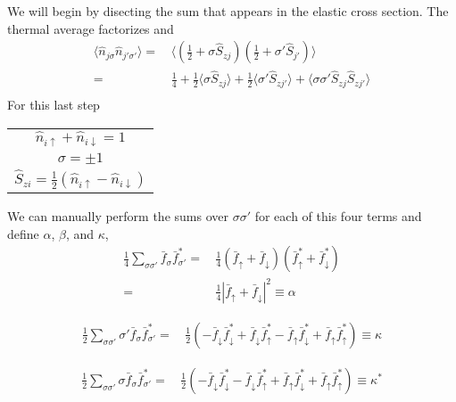 \documentclass[11pt,letter]{article}
\begin{document}
We will begin by disecting the sum that appears in the elastic cross section.   The thermal average factorizes and 
\begin{equation}
\begin{split}
\langle  \hat{n}_{j\sigma}\hat{n}_{j'\sigma'} \rangle = &\, \langle (\frac{1}{2}  + \sigma\hat{S}_{zj} )( \frac{1}{2} + \sigma'\hat{S}_{j'} ) \rangle \\
       = &\,  \frac{1}{4} + \frac{1}{2} \langle \sigma \hat{S}_{zj} \rangle +
\frac{1}{2} \langle \sigma'\hat{S}_{zj'} \rangle + \langle \sigma\sigma'\hat{S}_{zj}\hat{S}_{zj'}
\rangle \\
\end{split} 
\end{equation}
For this last step
\begin{center}
  \begin{tabular}{ c  }
    $\hat{n}_{i\uparrow} + \hat{n}_{i\downarrow} = 1$   \\ 
    $\sigma = \pm 1$ \\
    $\hat{S}_{zi} = \frac{1}{2}( \hat{n}_{i\uparrow} - \hat{n}_{i\downarrow} )$ 
  \end{tabular}
\end{center}
We can manually perform the sums over $\sigma\sigma'$ for each of this four terms and define $\alpha$, $\beta$, and $\kappa$,
\begin{equation}
\begin{split}
\frac{1}{4} \sum_{\sigma\sigma'} \bar{f}_{\sigma} \bar{f}_{\sigma'}^{*} = &\, 
            \frac{1}{4}(\bar{f}_{\uparrow} + \bar{f}_{\downarrow})( \bar{f}_{\uparrow}^{*} + \bar{f}_{\downarrow}^{*} ) \\
       =&\, \frac{1}{4} | \bar{f}_{\uparrow} + \bar{f}_{\downarrow} | ^{2} \equiv \alpha
\end{split} 
\end{equation} 

\begin{equation}
\begin{split}
\frac{1}{2} \sum_{\sigma\sigma'} \sigma'\bar{f}_{\sigma} \bar{f}_{\sigma'}^{*} = &\,  
  \frac{1}{2} ( 
            - \bar{f}_{\downarrow}\bar{f}_{\downarrow}^{*} 
            + \bar{f}_{\downarrow}\bar{f}_{\uparrow}^{*} 
            - \bar{f}_{\uparrow}\bar{f}_{\downarrow}^{*} 
            + \bar{f}_{\uparrow}\bar{f}_{\uparrow}^{*} ) \equiv \kappa 
\end{split} 
\end{equation} 

\begin{equation}
\begin{split}
\frac{1}{2} \sum_{\sigma\sigma'} \sigma \bar{f}_{\sigma} \bar{f}_{\sigma'}^{*} = &\, 
  \frac{1}{2} ( 
            - \bar{f}_{\downarrow}\bar{f}_{\downarrow}^{*} 
            - \bar{f}_{\downarrow}\bar{f}_{\uparrow}^{*} 
            + \bar{f}_{\uparrow}\bar{f}_{\downarrow}^{*} 
            + \bar{f}_{\uparrow}\bar{f}_{\uparrow}^{*} ) \equiv \kappa^{*}
\end{split} 
\end{equation} 
\end{document}
